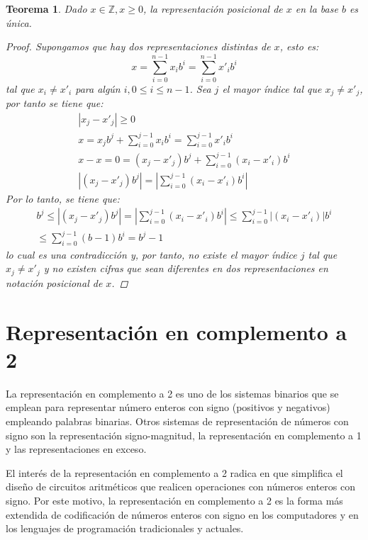 \documentclass[spanish,a4paper,12pt,titlepage]{article}
\newtheorem{theorem}{Teorema}%
\theoremstyle{definition}
\theoremstyle{remark}
\newcommand{\bbZ}{\mathbb{Z}}
\begin{document}
\begin{theorem}\label{theorem-pos-uniq}
  Dado $x \in \bbZ, x \ge 0$, la representación posicional de $x$ en
  la base $b$ es única.
  \begin{proof}
    Supongamos que hay dos representaciones distintas de $x$, esto es:
    \[
      x = \sum_{i=0}^{n-1} x_i b^i = \sum_{i=0}^{n-1} x'_i b^i
    \]
    tal que $x_i \neq x'_i$ para algún $i, 0 \le i \le n-1$. Sea $j$ el
    mayor índice tal que $x_j \neq x'_j$, por tanto se tiene que:
    \begin{align*}
      |x_j-x'_j| \ge 0 \\
      x = x_j b^j + \sum_{i=0}^{j-1} x_i b^i
        = \sum_{i=0}^{j-1} x'_i b^i \\
      x-x = 0 = (x_j-x'_j) b^j + \sum_{i=0}^{j-1} (x_i-x'_i)b^i \\
      \left| (x_j-x'_j) b^j \right| =
        \left| \sum_{i=0}^{j-1} (x_i-x'_i)b^i \right|
    \end{align*}
    Por lo tanto, se tiene que:
    \begin{align*}
      b^j \le \left| (x_j-x'_j) b^j \right|
        = \left| \sum_{i=0}^{j-1} (x_i-x'_i)b^i \right| \le
        \sum_{i=0}^{j-1} |(x_i-x'_i)|b^i \\
        \le \sum_{i=0}^{j-1} (b-1)b^i = b^j - 1
    \end{align*}
    lo cual es una contradicción y, por tanto, no existe el mayor índice
    $j$ tal que $x_j \neq x'_j$ y no existen cifras que sean diferentes en
    dos representaciones en notación posicional de $x$.
  \end{proof}
\end{theorem}

\section{Representación en complemento a 2}

La representación en complemento a 2 es uno de los sistemas binarios que se emplean para representar número enteros con signo (positivos y negativos) empleando palabras binarias. Otros sistemas de representación de números con signo son la representación signo-magnitud, la representación en complemento a 1 y las representaciones en exceso.

El interés de la representación en complemento a 2 radica en que simplifica el diseño de circuitos aritméticos que realicen operaciones con números enteros con signo. Por este motivo, la representación en complemento a 2 es la forma más extendida de codificación de números enteros con signo en los computadores y en los lenguajes de programación tradicionales y actuales.
\end{document}
